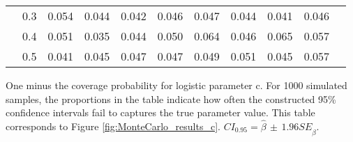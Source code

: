 \documentclass[12pt]{article}
\theoremstyle{definition}
\begin{document}
\begin{table}[b!]
\begin{threeparttable}
{\begin{tabular}[r]{l l l r r r r r r r r}
          & 0.3 & 0.054 & 0.044 & 0.042 & 0.046 & 0.047 & 0.044 & 0.041 & 0.046 \\
          & 0.4 & 0.051 & 0.035 & 0.044 & 0.050 & 0.064 & 0.046 & 0.065 & 0.057 \\
          & 0.5 & 0.041 & 0.045 & 0.047 & 0.047 & 0.049 & 0.051 & 0.045 & 0.057 \\
  \hline
    \end{tabular}
    }
    \begin{tablenotes}
      \item{\footnotesize One minus the coverage probability for logistic parameter c. For 1000 simulated samples, the proportions in the table indicate how often the constructed 95\% confidence intervals fail to captures the true parameter value. This table corresponds to Figure \ref{fig:MonteCarlo_results_c}. $CI_{0.95} = \hat\beta \, \pm \, 1.96 SE_{\hat{\beta}}$.}
    \end{tablenotes} \label{tbl:coverage_ratio_c}
  \end{threeparttable}
\end{table}
\end{document}
